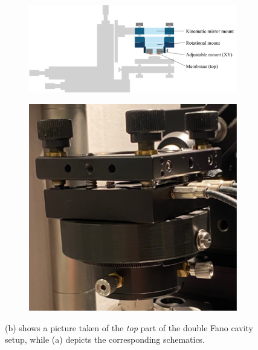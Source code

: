 \begin{figure}[h!]
    \centering
    \begin{subfigure}[b]{0.6\textwidth}
        \includegraphics[width=\textwidth]{figures/setup_top.pdf}
        \caption{}
        \label{fig:setup_top}
    \end{subfigure}
    \begin{subfigure}[b]{0.3\textwidth}
        \includegraphics[width=\textwidth]{figures/setup_top_pic.pdf}
        \caption{}
        \label{fig:setup_top_pic}
    \end{subfigure}
    \caption{(b) shows a picture taken of the \emph{top} part of the double Fano cavity setup, while (a) depicts the corresponding schematics.}
    \label{fig:setup_top_sketch_and_pic}
\end{figure} 

